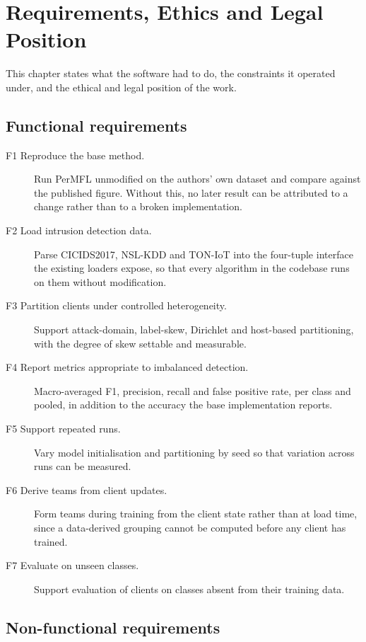 \chapter{Requirements, Ethics and Legal Position}
\label{chap:requirements}

This chapter states what the software had to do, the constraints it operated
under, and the ethical and legal position of the work.

\section{Functional requirements}
\label{sec:functional}

\begin{description}
  \item[F1 Reproduce the base method.] Run PerMFL unmodified on the authors'
    own dataset and compare against the published figure. Without this, no
    later result can be attributed to a change rather than to a broken
    implementation.
  \item[F2 Load intrusion detection data.] Parse CICIDS2017, NSL-KDD and
    TON-IoT into the four-tuple interface the existing loaders expose, so that
    every algorithm in the codebase runs on them without modification.
  \item[F3 Partition clients under controlled heterogeneity.] Support
    attack-domain, label-skew, Dirichlet and host-based partitioning, with the
    degree of skew settable and measurable.
  \item[F4 Report metrics appropriate to imbalanced detection.] Macro-averaged
    F1, precision, recall and false positive rate, per class and pooled, in
    addition to the accuracy the base implementation reports.
  \item[F5 Support repeated runs.] Vary model initialisation and partitioning
    by seed so that variation across runs can be measured.
  \item[F6 Derive teams from client updates.] Form teams during training from
    the client state rather than at load time, since a data-derived grouping
    cannot be computed before any client has trained.
  \item[F7 Evaluate on unseen classes.] Support evaluation of clients on
    classes absent from their training data.
\end{description}

\section{Non-functional requirements}
\label{sec:nonfunctional}

